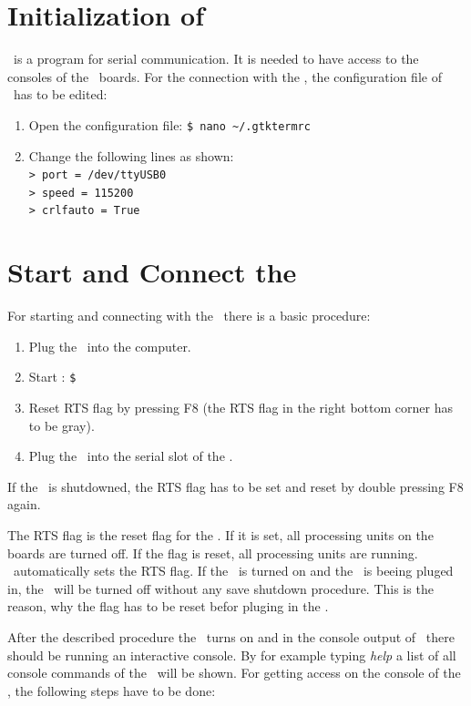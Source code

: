 \section{Initialization of \gtk}

\gtk\ is a program for serial communication. It is needed to have access to the consoles of the \amiro\ boards. For the connection with the \amiro, the configuration file of \gtk\ has to be edited:
\begin{enumerate}
\item Open the configuration file: {\tt\$ nano \textasciitilde/.gtktermrc}
\item Change the following lines as shown:\\
{\tt > port = /dev/ttyUSB0} \\
{\tt > speed = 115200} \\
{\tt > crlfauto = True}
\end{enumerate}

\section{Start and Connect the \amiro}

For starting and connecting with the \amiro\ there is a basic procedure:
\begin{enumerate}
\item Plug the \progcable\ into the computer.
\item Start \gtk: {\tt\$ \gtkC}
\item Reset RTS flag by pressing F8 (the RTS flag in the right bottom corner has to be gray).
\item Plug the \progcable\ into the serial slot of the \diwheel.
\end{enumerate}
If the \amiro\ is shutdowned, the RTS flag has to be set and reset by double pressing F8 again.

The RTS flag is the reset flag for the \amiro. If it is set, all processing units on the boards are turned off. If the flag is reset, all processing units are running. \gtk\ automatically sets the RTS flag. If the \amiro\ is turned on and the \progcable\ is beeing pluged in, the \amiro\ will be turned off without any save shutdown procedure. This is the reason, why the flag has to be reset befor pluging in the \progcable.

After the described procedure the \amiro\ turns on and in the console output of \gtk\ there should be running an interactive console. By for example typing {\it help} a list of all console commands of the \diwheel\ will be shown. For getting access on the console of the \cognition, the following steps have to be done:

